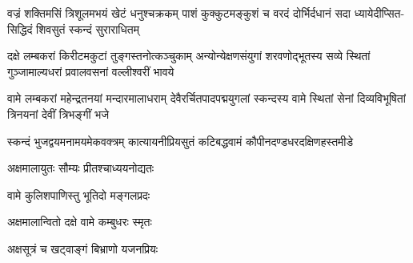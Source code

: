 {वज्रं शक्तिमसिं त्रिशूलमभयं खेटं धनुश्चक्रकम्}
{पाशं कुक्कुटमङ्कुशं च वरदं दोर्भिर्दधानं सदा}
{ध्यायेदीप्सित-सिद्धिदं शिवसुतं स्कन्दं सुराराधितम्}

{दक्षे लम्बकरां किरीटमकुटां तुङ्गस्तनोत्कञ्चुकाम्}
{अन्योन्येक्षणसंयुगां शरवणोद्भूतस्य सव्ये स्थितां}
{गुञ्जामाल्यधरां प्रवालवसनां वल्लीश्वरीं भावये}

{वामे लम्बकरां महेन्द्रतनयां मन्दारमालाधराम्}
{देवैरर्चितपादपद्मयुगलां स्कन्दस्य वामे स्थितां}
{सेनां दिव्यविभूषितां त्रिनयनां देवीं त्रिभङ्गीं भजे}

{स्कन्दं भुजद्वयमनामयमेकवक्त्रम्}
{कात्यायनीप्रियसुतं कटिबद्धवामं}
{कौपीनदण्डधरदक्षिणहस्तमीडे}


{अक्षमालायुतः सौम्यः प्रीतश्चाध्ययनोद्यतः}

{वामे कुलिशपाणिस्तु भूतिदो मङ्गलप्रदः} 

{अक्षमालान्वितो दक्षे वामे कम्बुधरः स्मृतः}

{अक्षसूत्रं च खट्वाङ्गं बिभ्राणो यजनप्रियः}

\closesub

